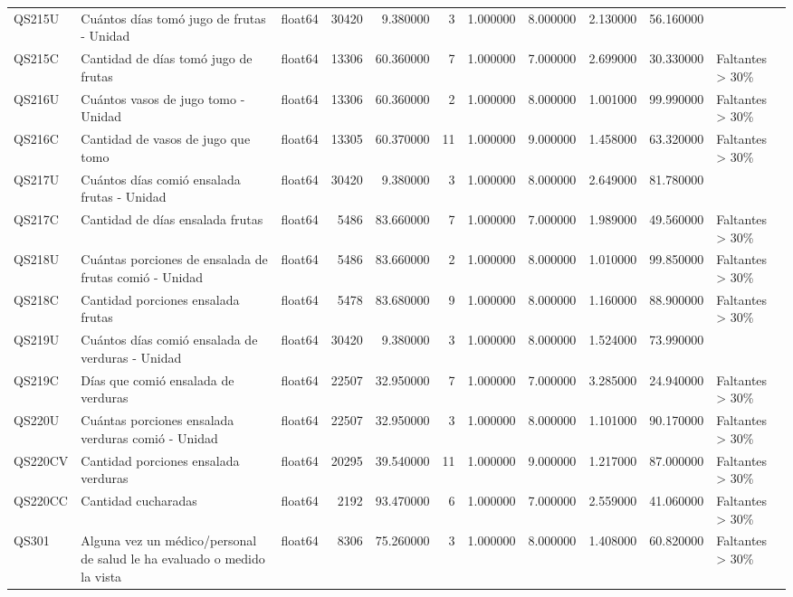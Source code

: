 \begin{longtable}{lllrrrrrrrl}
QS215U & Cuántos días tomó jugo de frutas - Unidad & float64 & 30420 & 9.380000 & 3 & 1.000000 & 8.000000 & 2.130000 & 56.160000 &  \\
QS215C & Cantidad de días tomó jugo de frutas & float64 & 13306 & 60.360000 & 7 & 1.000000 & 7.000000 & 2.699000 & 30.330000 & Faltantes > 30\% \\
QS216U & Cuántos vasos de jugo tomo - Unidad & float64 & 13306 & 60.360000 & 2 & 1.000000 & 8.000000 & 1.001000 & 99.990000 & Faltantes > 30\% \\
QS216C & Cantidad de vasos de jugo que tomo & float64 & 13305 & 60.370000 & 11 & 1.000000 & 9.000000 & 1.458000 & 63.320000 & Faltantes > 30\% \\
QS217U & Cuántos días comió ensalada frutas - Unidad & float64 & 30420 & 9.380000 & 3 & 1.000000 & 8.000000 & 2.649000 & 81.780000 &  \\
QS217C & Cantidad de días ensalada frutas & float64 & 5486 & 83.660000 & 7 & 1.000000 & 7.000000 & 1.989000 & 49.560000 & Faltantes > 30\% \\
QS218U & Cuántas porciones de ensalada de frutas comió - Unidad & float64 & 5486 & 83.660000 & 2 & 1.000000 & 8.000000 & 1.010000 & 99.850000 & Faltantes > 30\% \\
QS218C & Cantidad porciones ensalada frutas & float64 & 5478 & 83.680000 & 9 & 1.000000 & 8.000000 & 1.160000 & 88.900000 & Faltantes > 30\% \\
QS219U & Cuántos días comió ensalada de verduras - Unidad & float64 & 30420 & 9.380000 & 3 & 1.000000 & 8.000000 & 1.524000 & 73.990000 &  \\
QS219C & Días que comió ensalada de verduras & float64 & 22507 & 32.950000 & 7 & 1.000000 & 7.000000 & 3.285000 & 24.940000 & Faltantes > 30\% \\
QS220U & Cuántas porciones ensalada verduras comió - Unidad & float64 & 22507 & 32.950000 & 3 & 1.000000 & 8.000000 & 1.101000 & 90.170000 & Faltantes > 30\% \\
QS220CV & Cantidad porciones ensalada verduras & float64 & 20295 & 39.540000 & 11 & 1.000000 & 9.000000 & 1.217000 & 87.000000 & Faltantes > 30\% \\
QS220CC & Cantidad cucharadas & float64 & 2192 & 93.470000 & 6 & 1.000000 & 7.000000 & 2.559000 & 41.060000 & Faltantes > 30\% \\
QS301 & Alguna vez un médico/personal de salud le ha evaluado o medido la vista & float64 & 8306 & 75.260000 & 3 & 1.000000 & 8.000000 & 1.408000 & 60.820000 & Faltantes > 30\% \\

\end{longtable}
